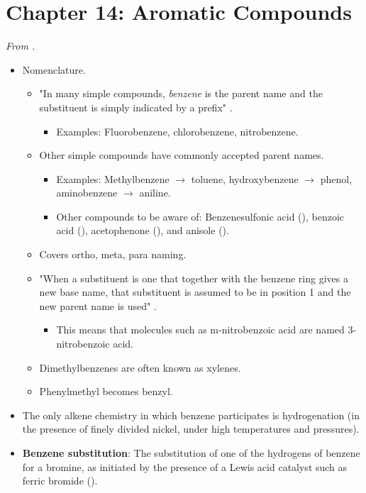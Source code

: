 \documentclass[../notes.tex]{subfiles}
\begin{document}
\section{Chapter 14: Aromatic Compounds}
\emph{From \textcite{bib:SolomonsEtAl}.}
\begin{itemize}
    \item {}Nomenclature.
    \begin{itemize}
        \item "In many simple compounds, \emph{benzene} is the parent name and the substituent is simply indicated by a prefix" \parencite[619]{bib:SolomonsEtAl}.
        \begin{itemize}
            \item Examples: Fluorobenzene, chlorobenzene, nitrobenzene.
        \end{itemize}
        \item Other simple compounds have commonly accepted parent names.
        \begin{itemize}
            \item Examples: Methylbenzene $\to$ toluene, hydroxybenzene $\to$ phenol, aminobenzene $\to$ aniline.
            \item Other compounds to be aware of: Benzenesulfonic acid (), benzoic acid (), acetophenone (), and anisole ().
        \end{itemize}
        \item Covers ortho, meta, para naming.
        \item "When a substituent is one that together with the benzene ring gives a new base name, that substituent is assumed to be in position 1 and the new parent name is used" \parencite[620]{bib:SolomonsEtAl}.
        \begin{itemize}
            \item This means that molecules such as m-nitrobenzoic acid are named 3-nitrobenzoic acid.
        \end{itemize}
        \item Dimethylbenzenes are often known as xylenes.
        \item Phenylmethyl becomes benzyl.
    \end{itemize}
    \item The only alkene chemistry in which benzene participates is hydrogenation (in the presence of finely divided nickel, under high temperatures and pressures).
    \item \textbf{Benzene substitution}: The substitution of one of the hydrogens of benzene for a bromine, as initiated by the presence of a Lewis acid catalyst such as ferric bromide ().

\end{itemize}
\end{document}
